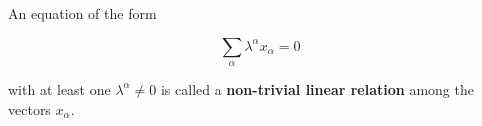 An equation of the form

$$\sum_{\alpha} \lambda^{\alpha} x_{\alpha} = 0$$

with at least one $\lambda^{\alpha} \neq 0$ is called a \textbf{non-trivial linear relation} among the vectors $x_{\alpha}$.
